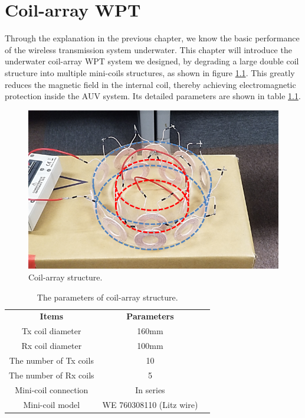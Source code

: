 \chapter{Coil-array WPT}
Through the explanation in the previous chapter, we know the basic performance of the wireless transmission system underwater. This chapter will introduce the underwater coil-array WPT system we designed, by degrading a large double coil structure into multiple mini-coils structures, as shown in figure \ref{fig:3_coil_array_structure}. This greatly reduces the magnetic field in the internal coil, thereby achieving electromagnetic protection inside the AUV system. Its detailed parameters are shown in table \ref{table: coil array parameters}.

\begin{figure}[!b]
    \centering
    \includegraphics[width=0.7\linewidth]{images/3_coil_array_structure.png}
    \caption{Coil-array structure.}
    \label{fig:3_coil_array_structure}
\end{figure}

\begin{table}[!t]
    \centering
    \caption{The parameters of coil-array structure.}
    \begin{tabular}{ c|cc }
        \thickhline
        \textbf{Items}         & \textbf{Parameters}      \\
        \thickhline
        Tx coil diameter       & 160mm                    \\ \hline
        Rx coil diameter       & 100mm                    \\ \hline
        The number of Tx coils & 10                       \\ \hline
        The number of Rx coils & 5                        \\ \hline
        Mini-coil connection        & In series                \\ \hline
        Mini-coil model             & WE 760308110 (Litz wire) \\ \hline
    \end{tabular}
    \label{table: coil array parameters}
\end{table}

